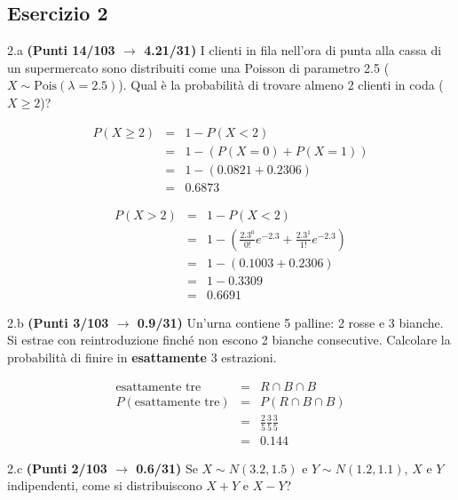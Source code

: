 \documentclass[
  11pt,
]{book}
\theoremstyle{mytheoremstyle}
\theoremstyle{mydefstyle}
\newenvironment{sol}
  {
  \begin{tcolorbox}[enhanced,breakable,arc=0.1mm,boxrule=1pt,colback=white,colframe=iblue,
  title=\bf \fontfamily{lmss}\selectfont \hspace{.5 cm} Soluzione,drop fuzzy shadow]

}{
\end{tcolorbox}
  }
\begin{document}
\subsection{Esercizio 2}\label{esercizio-2-21}

2.a \textbf{(Punti 14/103 \(\rightarrow\) 4.21/31)} I clienti in fila nell'ora di punta alla cassa di un supermercato sono distribuiti come una Poisson di parametro 2.5 (\(X\sim\text{Pois}(\lambda=2.5)\)). Qual è la probabilità di trovare almeno 2 clienti in coda (\(X\ge 2\))?

\begin{sol}
\begin{eqnarray*}
  P(X\ge 2) &=&  1-P(X<2)\\
  &=& 1-(P(X=0)+P(X=1))\\
  &=& 1-(0.0821+0.2306)\\
  &=& 0.6873
\end{eqnarray*}

\begin{eqnarray*}
   P( X > 2 ) &=& 1-P( X < 2 ) \\                 &=& 1-\left( \frac{ 2.3 ^{ 0 }}{ 0 !}e^{- 2.3 }+\frac{ 2.3 ^{ 1 }}{ 1 !}e^{- 2.3 } \right)\\                 &=& 1-( 0.1003+0.2306 )\\                 &=& 1- 0.3309 \\                 &=&   0.6691 
\end{eqnarray*}

\end{sol}

2.b \textbf{(Punti 3/103 \(\rightarrow\) 0.9/31)} Un'urna contiene 5 palline: 2 rosse e 3 bianche. Si estrae con reintroduzione finché non escono 2 bianche consecutive. Calcolare la probabilità di finire in \textbf{esattamente} 3 estrazioni.

\begin{sol}
\begin{eqnarray*}
  \text{esattamente tre} &=& R\cap B\cap B \\
  P(\text{esattamente tre}) &=& P(R\cap B\cap B)\\
  &=&\frac 25 \frac 35\frac 35\\
  &=& 0.144
\end{eqnarray*}

\end{sol}

2.c \textbf{(Punti 2/103 \(\rightarrow\) 0.6/31)} Se \(X\sim N(3.2,1.5)\) e \(Y\sim N(1.2,1.1)\), \(X\) e \(Y\) indipendenti, come si distribuiscono \(X+Y\) e \(X-Y\)?
\end{document}
